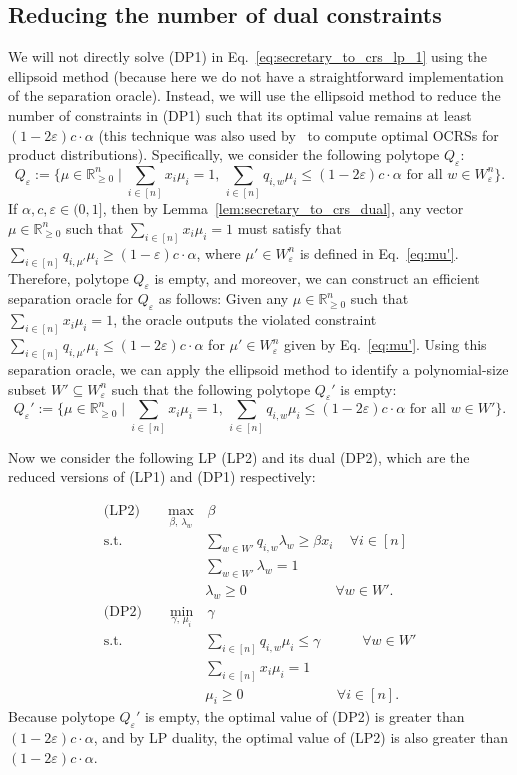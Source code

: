 \documentclass[11pt]{article}
\newcommand{\eps}{\varepsilon}
\newcommand{\R}{{\mathbb R}}
\begin{document}
\subsection{Reducing the number of dual constraints}
We will not directly solve (DP1) in Eq.~\eqref{eq:secretary_to_crs_lp_1} using the ellipsoid method (because here we do not have a straightforward implementation of the separation oracle). Instead, we will use the ellipsoid method to reduce the number of constraints in (DP1) such that its optimal value remains at least $(1-2\eps)c\cdot\alpha$ (this technique was also used by~\citet{lee2018optimal} to compute optimal OCRSs for product distributions). Specifically, we consider the following polytope $Q_{\eps}$:
\[
    Q_{\eps}:=\{\mu\in\R_{\ge0}^n\mid \sum_{i\in[n]}x_i\mu_i=1,\,\sum_{i\in[n]} q_{i,w}\mu_i\le (1-2\eps)c\cdot\alpha\textrm{ for all }w\in W_{\eps}^n\}.
\]
If $\alpha,c,\eps\in(0,1]$, then by Lemma~\ref{lem:secretary_to_crs_dual}, any vector $\mu\in\R_{\ge0}^n$ such that $\sum_{i\in[n]}x_i\mu_i=1$ must satisfy that $\sum_{i\in[n]} q_{i,\mu'}\mu_i\ge (1-\eps)c\cdot\alpha$, where $\mu'\in W_{\eps}^n$ is defined in Eq.~\eqref{eq:mu'}. Therefore, polytope $Q_{\eps}$ is empty, and moreover, we can construct an efficient separation oracle for $Q_{\eps}$ as follows: Given any $\mu\in\R_{\ge0}^n$ such that $\sum_{i\in[n]}x_i\mu_i=1$, the oracle outputs the violated constraint $\sum_{i\in[n]} q_{i,\mu'}\mu_i\le (1-2\eps)c\cdot\alpha$ for $\mu'\in W_{\eps}^n$ given by Eq.~\eqref{eq:mu'}. Using this separation oracle, we can apply the ellipsoid method to identify a polynomial-size subset $W'\subseteq W_{\eps}^n$ such that the following polytope $Q_{\eps}'$ is empty:
\[
    Q_{\eps}':=\{\mu\in\R_{\ge0}^n\mid \sum_{i\in[n]}x_i\mu_i=1,\,\sum_{i\in[n]} q_{i,w}\mu_i\le (1-2\eps)c\cdot\alpha\textrm{ for all }w\in W'\}.
\]

Now we consider the following LP (LP2) and its dual (DP2), which are the reduced versions of (LP1) and (DP1) respectively:

\begin{align}\label{eq:secretary_to_crs_lp_2}
    \textrm{(LP2)}\qquad\max_{\beta,\,\lambda_w}&\,\beta\nonumber\\
    \textrm{s.t. }& \sum_{w\in W'} q_{i,w}\lambda_w\ge\beta x_i \quad\,\forall i\in [n]\nonumber\\
    & \sum_{w\in W'}\lambda_w=1\nonumber\\
    & \lambda_w\ge 0 \qquad\qquad\qquad\,\,\forall w\in W'.\nonumber\\
    \textrm{(DP2)}\qquad\min_{\gamma,\,\mu_i}&\,\gamma\nonumber\\
    \textrm{s.t. }& \sum_{i\in[n]} q_{i,w}\mu_i\le\gamma \qquad\,\,\,\,\,\,\forall w\in W'\nonumber\\
    & \sum_{i\in[n]}x_i\mu_i=1\nonumber\\
    & \mu_i\ge 0 \qquad\qquad\qquad\,\,\,\,\forall i\in [n].
\end{align}
Because polytope $Q_{\eps}'$ is empty, the optimal value of (DP2) is greater than $(1-2\eps)c\cdot\alpha$, and by LP duality, the optimal value of (LP2) is also greater than $(1-2\eps)c\cdot\alpha$.
\end{document}
